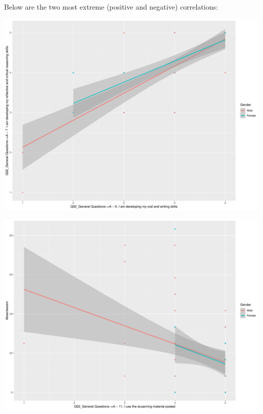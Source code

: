 \documentclass[
]{article}
\begin{document}
Below are the two most extreme (positive and negative) correlations:

\includegraphics{AnalysisOfCourseEvaluation-Notebook_files/figure-latex/DrillDownCorr1-1.pdf}

\includegraphics{AnalysisOfCourseEvaluation-Notebook_files/figure-latex/DrillDownCorr2-1.pdf}
\end{document}
